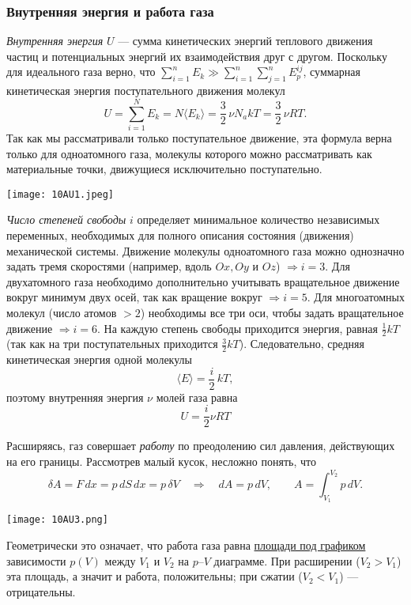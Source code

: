 \documentclass[12pt, a4paper]{article}%
\begin{document}
\subsubsection*{Внутренняя энергия и работа газа}
\textit{Внутренняя энергия} $U$ — сумма кинетических энергий теплового движения частиц и потенциальных энергий их взаимодействия друг с другом. Поскольку для идеального газа верно, что $\sum_{i=1}^n E_k \gg \sum_{i=1}^n \sum_{j=1}^n E_p^{ij}$, суммарная кинетическая энергия поступательного движения молекул
\[
U=\sum_{i=1}^{N} E_k=N\langle E_k\rangle=\frac{3}{2}\,\nu N_a k T=\frac{3}{2}\,\nu R T.
\]
Так как мы рассматривали только поступательное движение, эта формула верна только для одноатомного газа, молекулы которого можно рассматривать как материальные точки, движущиеся исключительно поступательно. 

\begin{center}
\texttt{[image: 10AU1.jpeg]}
\label{fig:mpr}
\end{center}

\textit{Число степеней свободы} $i$ определяет минимальное количество независимых переменных, необходимых для полного описания состояния (движения) механической системы. Движение молекулы одноатомного газа можно однозначно задать тремя скоростями (например, вдоль $Ox, Oy$ и $Oz$) $\Rightarrow i=3$. Для двухатомного газа необходимо дополнительно учитывать вращательное движение вокруг минимум двух осей, так как вращение вокруг  $\Rightarrow i=5$. Для многоатомных молекул (число атомов $>2$) необходимы все три оси, чтобы задать вращательное движение $\Rightarrow i=6$. На каждую степень свободы приходится энергия, равная $\tfrac{1}{2}kT$ (так как на три поступательных приходится $\tfrac{3}{2}kT$). Следовательно, средняя кинетическая энергия одной молекулы
\[
\langle E\rangle=\frac{i}{2}\,kT,
\]
поэтому внутренняя энергия $\nu$ молей газа равна 
\[
U = \frac{i}{2}\nu RT
\]

Расширяясь, газ совершает \textit{работу} по преодолению сил давления, действующих на его границы. Рассмотрев малый кусок, несложно понять, что
\[
\delta A=F\,dx=p\,dS\,dx=p\,\delta V \quad \Longrightarrow \quad dA=p\,dV,\qquad
A=\int_{V_1}^{V_2} p\,dV.
\]

\begin{center}
\texttt{[image: 10AU3.png]}
\label{fig:mpr}
\end{center}

Геометрически это означает, что работа газа равна \underline{площади под графиком} зависимости $p(V)$ между $V_1$ и $V_2$ на $p$–$V$ диаграмме. При расширении ($V_2>V_1$) эта площадь, а значит и работа, положительны; при сжатии ($V_2 < V_1$) — отрицательны.
\end{document}
